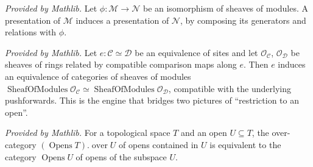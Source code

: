 \begin{lemma}
  \label{lem:presentation_ofIsIso_mathlib}
  \mathlibok
  \textit{Provided by Mathlib.}
  Let \(\phi : \mathcal{M} \to \mathcal{N}\) be an isomorphism of sheaves of modules. A presentation of
  \(\mathcal{M}\) induces a presentation of \(\mathcal{N}\), by composing its generators and relations
  with \(\phi\).
\end{lemma}

\begin{lemma}
  \label{lem:pushforwardPushforwardEquivalence_mathlib}
  \mathlibok
  \textit{Provided by Mathlib.}
  Let \(e : \mathcal{C} \simeq \mathcal{D}\) be an equivalence of sites and let
  \(\mathcal{O}_{\mathcal{C}}\), \(\mathcal{O}_{\mathcal{D}}\) be sheaves of rings related by
  compatible comparison maps along \(e\). Then \(e\) induces an equivalence of categories of sheaves of
  modules \(\operatorname{SheafOfModules} \mathcal{O}_{\mathcal{C}} \simeq
  \operatorname{SheafOfModules} \mathcal{O}_{\mathcal{D}}\), compatible with the underlying
  pushforwards. This is the engine that bridges two pictures of ``restriction to an open''.
\end{lemma}

\begin{lemma}
  \label{lem:overEquivalence_mathlib}
  \mathlibok
  \textit{Provided by Mathlib.}
  For a topological space \(T\) and an open \(U \subseteq T\), the over-category
  \((\operatorname{Opens} T).\operatorname{over} U\) of opens contained in \(U\) is equivalent to the
  category \(\operatorname{Opens} U\) of opens of the subspace \(U\).
\end{lemma}

